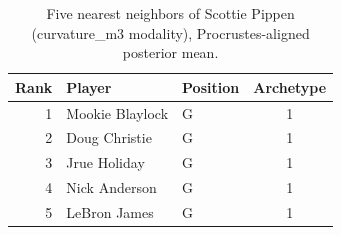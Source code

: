 \begin{table}[htbp]
  \centering\small
  \begin{tabular}{rllc}
    \toprule
    Rank & Player & Position & Archetype \\
    \midrule
    1 & Mookie Blaylock & G & 1 \\
    2 & Doug Christie & G & 1 \\
    3 & Jrue Holiday & G & 1 \\
    4 & Nick Anderson & G & 1 \\
    5 & LeBron James & G & 1 \\
    \bottomrule
  \end{tabular}
  \caption{Five nearest neighbors of Scottie Pippen (curvature_m3 modality), Procrustes-aligned posterior mean.}
  \label{tab:Scottie_Pippen_neighbors_curvature_m3}
\end{table}

